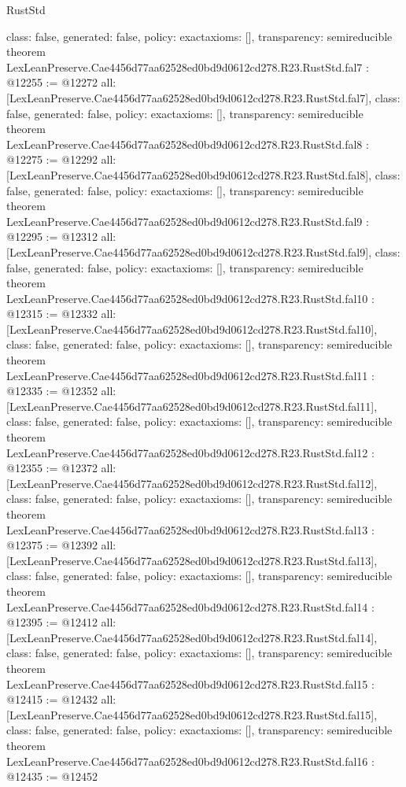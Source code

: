 \begin{lexlean}{RustStd}
\begin{coremodule}
{  class: false,
  generated: false,
  policy: exact{axioms: []},
  transparency: semireducible
}
theorem LexLeanPreserve.Cae4456d77aa62528ed0bd9d0612cd278.R23.RustStd.fal7 : @12255 := @12272 {
  all: [LexLeanPreserve.Cae4456d77aa62528ed0bd9d0612cd278.R23.RustStd.fal7],
  class: false,
  generated: false,
  policy: exact{axioms: []},
  transparency: semireducible
}
theorem LexLeanPreserve.Cae4456d77aa62528ed0bd9d0612cd278.R23.RustStd.fal8 : @12275 := @12292 {
  all: [LexLeanPreserve.Cae4456d77aa62528ed0bd9d0612cd278.R23.RustStd.fal8],
  class: false,
  generated: false,
  policy: exact{axioms: []},
  transparency: semireducible
}
theorem LexLeanPreserve.Cae4456d77aa62528ed0bd9d0612cd278.R23.RustStd.fal9 : @12295 := @12312 {
  all: [LexLeanPreserve.Cae4456d77aa62528ed0bd9d0612cd278.R23.RustStd.fal9],
  class: false,
  generated: false,
  policy: exact{axioms: []},
  transparency: semireducible
}
theorem LexLeanPreserve.Cae4456d77aa62528ed0bd9d0612cd278.R23.RustStd.fal10 : @12315 := @12332 {
  all: [LexLeanPreserve.Cae4456d77aa62528ed0bd9d0612cd278.R23.RustStd.fal10],
  class: false,
  generated: false,
  policy: exact{axioms: []},
  transparency: semireducible
}
theorem LexLeanPreserve.Cae4456d77aa62528ed0bd9d0612cd278.R23.RustStd.fal11 : @12335 := @12352 {
  all: [LexLeanPreserve.Cae4456d77aa62528ed0bd9d0612cd278.R23.RustStd.fal11],
  class: false,
  generated: false,
  policy: exact{axioms: []},
  transparency: semireducible
}
theorem LexLeanPreserve.Cae4456d77aa62528ed0bd9d0612cd278.R23.RustStd.fal12 : @12355 := @12372 {
  all: [LexLeanPreserve.Cae4456d77aa62528ed0bd9d0612cd278.R23.RustStd.fal12],
  class: false,
  generated: false,
  policy: exact{axioms: []},
  transparency: semireducible
}
theorem LexLeanPreserve.Cae4456d77aa62528ed0bd9d0612cd278.R23.RustStd.fal13 : @12375 := @12392 {
  all: [LexLeanPreserve.Cae4456d77aa62528ed0bd9d0612cd278.R23.RustStd.fal13],
  class: false,
  generated: false,
  policy: exact{axioms: []},
  transparency: semireducible
}
theorem LexLeanPreserve.Cae4456d77aa62528ed0bd9d0612cd278.R23.RustStd.fal14 : @12395 := @12412 {
  all: [LexLeanPreserve.Cae4456d77aa62528ed0bd9d0612cd278.R23.RustStd.fal14],
  class: false,
  generated: false,
  policy: exact{axioms: []},
  transparency: semireducible
}
theorem LexLeanPreserve.Cae4456d77aa62528ed0bd9d0612cd278.R23.RustStd.fal15 : @12415 := @12432 {
  all: [LexLeanPreserve.Cae4456d77aa62528ed0bd9d0612cd278.R23.RustStd.fal15],
  class: false,
  generated: false,
  policy: exact{axioms: []},
  transparency: semireducible
}
theorem LexLeanPreserve.Cae4456d77aa62528ed0bd9d0612cd278.R23.RustStd.fal16 : @12435 := @12452 {
}
\end{coremodule}
\end{lexlean}
